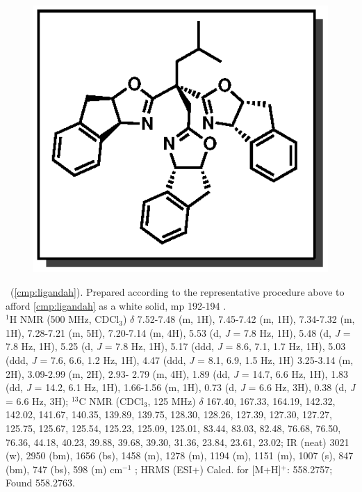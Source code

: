 
\pagebreak
\begin{figure}
  \vspace{-15pt}
  \begin{center}
    \includegraphics[scale=0.8]{chp_asymmetric/images/ligandah}
  \end{center}
  \vspace{-25pt}
\end{figure}
\noindent \textbf{\CMPligandah}\ (\ref{cmp:ligandah}). Prepared according to the representative
procedure above to afford \ref{cmp:ligandah} as a white solid, mp 192-194 \degc. \\
$^1$H NMR (500 MHz, CDCl$_3$) $\delta$ 7.52-7.48 (m, 1H), 7.45-7.42 (m, 1H), 7.34-7.32 (m, 1H),
7.28-7.21 (m, 5H), 7.20-7.14 (m, 4H), 5.53 (d, \textit{J} = 7.8 Hz, 1H), 5.48 (d, \textit{J} = 7.8
Hz, 1H), 5.25 (d, \textit{J} = 7.8 Hz, 1H), 5.17 (ddd, \textit{J} = 8.6, 7.1, 1.7 Hz, 1H), 5.03 (ddd,
\textit{J} = 7.6, 6.6, 1.2 Hz, 1H), 4.47 (ddd, \textit{J} = 8.1, 6.9, 1.5 Hz, 1H) 3.25-3.14 (m, 2H),
3.09-2.99 (m, 2H), 2.93- 2.79 (m, 4H), 1.89 (dd, \textit{J} = 14.7, 6.6 Hz, 1H), 1.83 (dd,
\textit{J} = 14.2, 6.1 Hz, 1H), 1.66-1.56 (m, 1H), 0.73 (d, \textit{J} = 6.6 Hz, 3H), 0.38 (d,
\textit{J} = 6.6 Hz, 3H); $^{13}$C NMR (CDCl$_3$, 125 MHz) $\delta$ 167.40, 167.33, 164.19, 142.32,
142.02, 141.67, 140.35, 139.89, 139.75, 128.30, 128.26, 127.39, 127.30, 127.27, 125.75, 125.67,
125.54, 125.23, 125.09, 125.01, 83.44, 83.03, 82.48, 76.68, 76.50, 76.36, 44.18, 40.23, 39.88,
39.68, 39.30, 31.36, 23.84, 23.61, 23.02; IR (neat) 3021 (w), 2950 (bm), 1656 (bs), 1458 (m), 1278
(m), 1194 (m), 1151 (m), 1007 (s), 847 (bm), 747 (bs), 598 (m) cm$^{-1}$ ; HRMS (ESI+) Calcd. for
 [M+H]$^+$: 558.2757; Found 558.2763.

